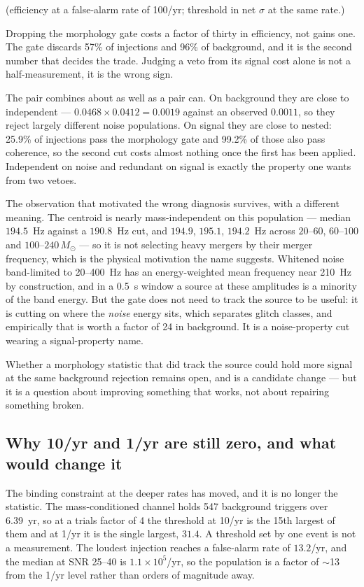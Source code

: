 \documentclass[11pt]{article}
\begin{document}
(efficiency at a false-alarm rate of 100/yr; threshold in net $\sigma$ at the same rate.)

Dropping the morphology gate costs a factor of thirty in efficiency, not gains one. The
gate discards 57\% of injections and 96\% of background, and it is the second number
that decides the trade. Judging a veto from its signal cost alone is not a
half-measurement, it is the wrong sign.

The pair combines about as well as a pair can. On background they are close to
independent --- $0.0468 \times 0.0412 = 0.0019$ against an observed $0.0011$, so they
reject largely different noise populations. On signal they are close to nested: 25.9\% of
injections pass the morphology gate and 99.2\% of those also pass coherence, so the
second cut costs almost nothing once the first has been applied. Independent on noise and
redundant on signal is exactly the property one wants from two vetoes.

The observation that motivated the wrong diagnosis survives, with a different meaning.
The centroid is nearly mass-independent on this population --- median $194.5$~Hz against
a $190.8$~Hz cut, and $194.9$, $195.1$, $194.2$~Hz across $20$--$60$, $60$--$100$ and
$100$--$240\,M_\odot$ --- so it is not selecting heavy mergers by their merger frequency,
which is the physical motivation the name suggests. Whitened noise band-limited to
20--400~Hz has an energy-weighted mean frequency near 210~Hz by construction, and in a
0.5~s window a source at these amplitudes is a minority of the band energy. But the gate
does not need to track the source to be useful: it is cutting on where the \emph{noise}
energy sits, which separates glitch classes, and empirically that is worth a factor of 24
in background. It is a noise-property cut wearing a signal-property name.

Whether a morphology statistic that did track the source could hold more signal at the
same background rejection remains open, and is a candidate change --- but it is a
question about improving something that works, not about repairing something broken.

\subsection*{Why 10/yr and 1/yr are still zero, and what would change it}

The binding constraint at the deeper rates has moved, and it is no longer the statistic.
The mass-conditioned channel holds 547 background triggers over 6.39~yr, so at a trials
factor of 4 the threshold at 10/yr is the 15th largest of them and at 1/yr it is the
single largest, $31.4$. A threshold set by one event is not a measurement. The loudest
injection reaches a false-alarm rate of $13.2$/yr, and the median at SNR 25--40 is
$1.1\times10^5$/yr, so the population is a factor of $\sim$13 from the 1/yr level rather
than orders of magnitude away.
\end{document}
